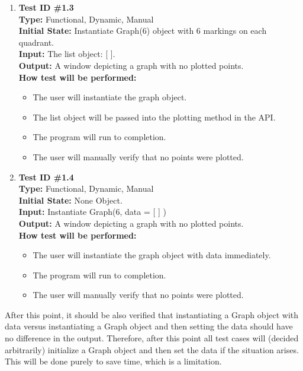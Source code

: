 \documentclass[12pt, titlepage]{article}
\begin{document}
\begin{enumerate}
			\item{\textbf{Test ID \#1.3\\}}
			\textbf{Type:} Functional, Dynamic, Manual\\
			\textbf{Initial State:} Instantiate Graph(6) object with 6 markings on each quadrant.\\
			\textbf{Input:} The list object: [	].\\
			\textbf{Output:} A window depicting a graph with no plotted points.\\
			\textbf{How test will be performed:}
				\begin{itemize}[label={--}]
					\item The user will instantiate the graph object.
					\item The list object will be passed into the plotting method in the API.
					\item The program will run to completion.
					\item The user will manually verify that no points were plotted.
				\end{itemize}				

			\item{\textbf{Test ID \#1.4\\}}
			\textbf{Type:} Functional, Dynamic, Manual\\
			\textbf{Initial State:} None Object.\\
			\textbf{Input:} Instantiate Graph(6, data = [  ] )\\
			\textbf{Output:} A window depicting a graph with no plotted points.\\
			\textbf{How test will be performed:}
				\begin{itemize}[label={--}]
					\item The user will instantiate the graph object with data immediately.
					\item The program will run to completion.
					\item The user will manually verify that no points were plotted.
				\end{itemize}	
	\end{enumerate}
After this point, it should be also verified that instantiating a Graph object with data versus instantiating a Graph object and then setting the data should have no difference in the output. Therefore, after this point all test cases will (decided arbitrarily) initialize a Graph object and then set the data if the situation arises. This will be done purely to save time, which is a limitation. 
\end{document}
